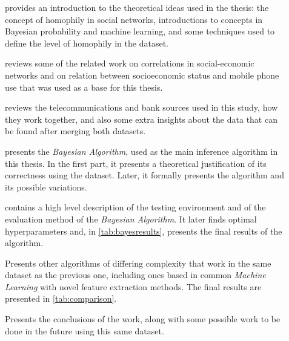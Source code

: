 \begin{description}
\item[] provides an introduction to the theoretical ideas used in the thesis: the concept of homophily in social networks, introductions to concepts in Bayesian probability and machine learning, and some techniques used to define the level of homophily in the dataset.
\item[] reviews some of the related work on correlations in social-economic networks and on relation between socioeconomic status and mobile phone use that was used as a base for this thesis.
\item[] reviews the telecommunications and bank sources used in this study, how they work together, and also some extra insights about the data that can be found after merging both datasets.
\item[] presents the \emph{Bayesian Algorithm}, used as the main inference algorithm in this thesis. In the first part, it presents a theoretical justification of its correctness using the dataset. Later, it formally presents the algorithm and its possible variations.
\item[] contains a high level description of the testing environment and of the evaluation method of the \emph{Bayesian Algorithm}. It later finds optimal hyperparameters and, in \cref{tab:bayesresults}, presents the final results of the algorithm.
\item[] Presents other algorithms of differing complexity that work in the same dataset as the previous one, including ones based in common \emph{Machine Learning} with novel feature extraction methods. The final results are presented in \cref{tab:comparison}.
\item[] Presents the conclusions of the work, along with some possible work to be done in the future using this same dataset.
\end{description}
